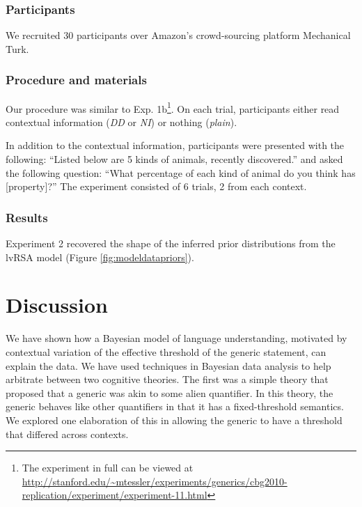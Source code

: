 \documentclass[10pt,letterpaper]{article}
\begin{document}
\subsubsection{Participants}

We recruited 30 participants over Amazon's crowd-sourcing platform Mechanical Turk. 

\subsubsection{Procedure and materials}

Our procedure was similar to Exp. 1b\footnote{The experiment in full can be viewed at \url{http://stanford.edu/~mtessler/experiments/generics/cbg2010-replication/experiment/experiment-11.html}}. On each trial, participants either read contextual information (\emph{DD} or \emph{NI}) or nothing (\emph{plain}). 

In addition to the contextual information, participants were presented with the following: ``Listed below are 5 kinds of animals, recently discovered.'' and asked the following question: ``What percentage of each kind of animal do you think has [property]?'' The experiment consisted of 6 trials, 2 from each context. 

\subsubsection{Results}

Experiment 2 recovered the shape of the inferred prior distributions from the lvRSA model (Figure \ref{fig:modeldatapriors}).


\section{Discussion}

We have shown how a Bayesian model of language understanding, motivated by contextual variation of the effective threshold of the generic statement, can explain the data. We have used techniques in Bayesian data analysis to help arbitrate between two cognitive theories. The first was a simple theory that proposed that a generic was akin to some alien quantifier. In this theory, the generic behaves like other quantifiers in that it has a fixed-threshold semantics. We explored one elaboration of this in allowing the generic to have a threshold that differed across contexts. 
\end{document}
